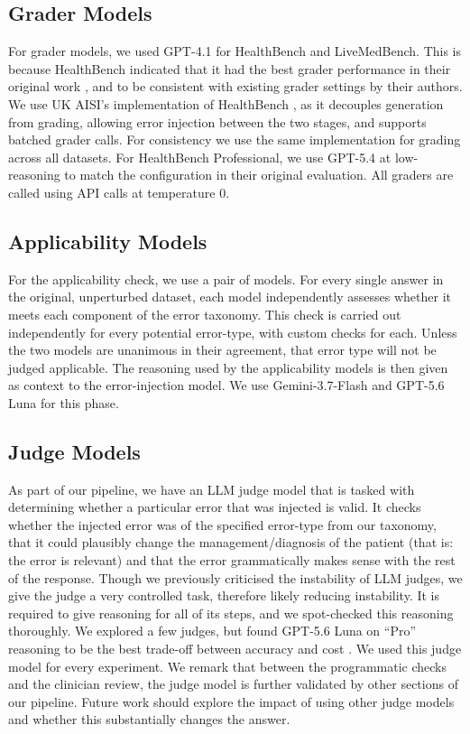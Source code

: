 \documentclass{article}
\begin{document}
\subsection*{Grader Models}
For grader models, we used GPT-4.1 \citep{openai2025gpt41} for HealthBench and LiveMedBench. This is because HealthBench indicated that it had the best grader performance in their original work \citep{arorahealthbench2025}, and to be consistent with existing grader settings by their authors. We use UK AISI's implementation of HealthBench \citep{inspectevals}, as it decouples generation from grading, allowing error injection between the two stages, and supports batched grader calls. For consistency we use the same implementation for grading across all datasets. For HealthBench Professional, we use GPT-5.4 \citep{openai2026gpt54api} at low-reasoning to match the configuration in their original evaluation. All graders are called using API calls at temperature 0.

\subsection*{Applicability Models}
For the applicability check, we use a pair of models. For every single answer in the original, unperturbed dataset, each model independently assesses whether it meets each component of the error taxonomy. This check is carried out independently for every potential error-type, with custom checks for each. Unless the two models are unanimous in their agreement, that error type will not be judged applicable. The reasoning used by the applicability models is then given as context to the error-injection model. We use Gemini-3.7-Flash \citep{google2026gemini37flash} and GPT-5.6 Luna \citep{OpenAI2026GPT56} for this phase. 

\subsection*{Judge Models}
As part of our pipeline, we have an LLM judge model that is tasked with determining whether a particular error that was injected is valid. It checks whether the injected error was of the specified error-type from our taxonomy, that it could plausibly change the management/diagnosis of the patient (that is: the error is relevant) and that the error grammatically makes sense with the rest of the response. Though we previously criticised the instability of LLM judges, we give the judge a very controlled task, therefore likely reducing instability. It is required to give reasoning for all of its steps, and we spot-checked this reasoning thoroughly. We explored a few judges, but found GPT-5.6 Luna on ``Pro'' reasoning to be the best trade-off between accuracy and cost \citep{OpenAI2026GPT56}. We used this judge model for every experiment. We remark that between the programmatic checks and the clinician review, the judge model is further validated by other sections of our pipeline. Future work should explore the impact of using other judge models and whether this substantially changes the answer.
\end{document}
